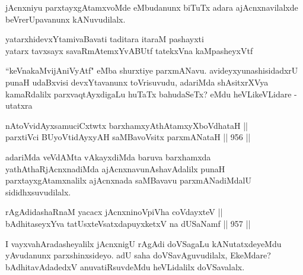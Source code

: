 \begin{artha}
jAcnxniyu parxtayxgAtamxvoMde eMbudanunx biTuTx adara ajAcnxnavilalxde beVrerUpavanunx kANuvudilalx.
\end{artha}
	
\begin{shl}
yatarxhidevxYtamivaBavati taditara itaraM pashayxti \\
yatarx tavxsayx savaRmAtemxYvABUtf tatekxVna kaMpasheyxVtf
\end{shl}	
	
\begin{artha}
``keVnakaMvijAniVyAtf" eMba shurxtiye parxmANavu. avideyxyunashisidadxrU punaH udaBxvisi devxYtavanunx toVrisuvudu, adariMda shAsitxrXVya kamaRdalilx parxvaqtAyxdigaLu huTaTx bahudaSeTx? eMdu heVLikeVLidare - utatxra
\end{artha}

\begin{shl}
nAtoV\s vidAyxsamuciCxtwtx barxhamxyAthAtamxyXboVdhataH || \\
parxtiVci BUyoV\s tidAyxyAH saMBavoV\s sitx parxmANataH \hfill || 956 ||  
\end{shl}

\begin{artha}
adariMda veVdAMta vAkayxdiMda baruva barxhamxda yathAthaRjAcnxnadiMda ajAcnxnavunAshavAdalilx punaH parxtayxgAtamxnalilx ajAcnxnada saMBavavu parxmANadiMdalU sididhxsuvudilalx.
\end{artha}


\begin{shl}
rAgAdidashaRnaM yacacx jAcnxninoV\s piVha coVdayxteV || \\
\footnotemark[1]bAdhitaseyxYva tatUsxteVsatxdapuyxketxV na dUSaNamf \hfill || 957 ||  
\end{shl}

\begin{artha}
I vayxvahAradasheyalilx jAcnxnigU rAgAdi doVSagaLu kANutatxdeyeMdu yAvudanunx parxshinxsideyo. adU saha doVSavAguvudilalx, EkeMdare? bAdhitavAdadedxV anuvatiRsuvdeMdu heVLidalilx doVSavalalx.
\end{artha}

